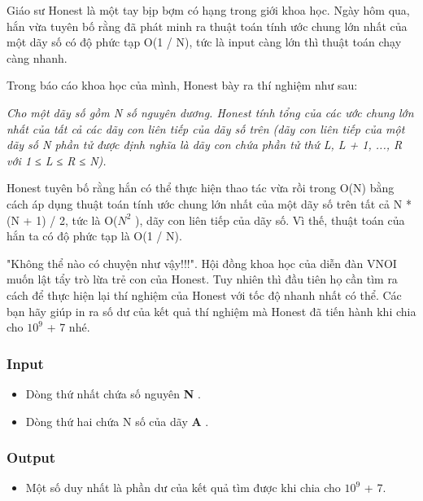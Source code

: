 



   Giáo sư Honest là một tay bịp bợm có hạng trong giới khoa học. Ngày hôm qua, hắn vừa tuyên bố rằng đã phát minh ra thuật toán tính ước chung lớn nhất của một dãy số có độ phức tạp O(1 / N), tức là input càng lớn thì thuật toán chạy càng nhanh.  

   Trong báo cáo khoa học của mình, Honest bày ra thí nghiệm như sau:  

\emph{    Cho một dãy số gồm N số nguyên dương. Honest tính tổng của các ước chung lớn nhất của tất cả các dãy con liên tiếp của dãy số trên (dãy con liên tiếp của một dãy số N phần tử được định nghĩa là dãy con chứa phần tử thứ L, L + 1, ..., R với 1 ≤ L ≤ R ≤ N).   }

   Honest tuyên bố rằng hắn có thể thực hiện thao tác vừa rồi trong O(N) bằng cách áp dụng thuật toán tính ước chung lớn nhất của một dãy số trên tất cả N * (N + 1) / 2, tức là O($N^{2}$   ), dãy con liên tiếp của dãy số. Vì thế, thuật toán của hắn ta có độ phức tạp là O(1 / N).  

   "Không thể nào có chuyện như vậy!!!". Hội đồng khoa học của diễn đàn VNOI muốn lật tẩy trò lừa trẻ con của Honest. Tuy nhiên thì đầu tiên họ cần tìm ra cách để thực hiện lại thí nghiệm của Honest với tốc độ nhanh nhất có thể. Các bạn hãy giúp in ra số dư của kết quả thí nghiệm mà Honest đã tiến hành khi chia cho $10^{9}$   + 7 nhé.  

\subsubsection{   Input  }
\begin{itemize}
	\item     Dòng thứ nhất chứa số nguyên    \textbf{     N    }    .   
	\item     Dòng thứ hai chứa N số của dãy    \textbf{     A    }    .   
\end{itemize}

\subsubsection{   Output  }
\begin{itemize}
	\item     Một số duy nhất là phần dư của kết quả tìm được khi chia cho $10^{9}$    + 7.   
\end{itemize}

